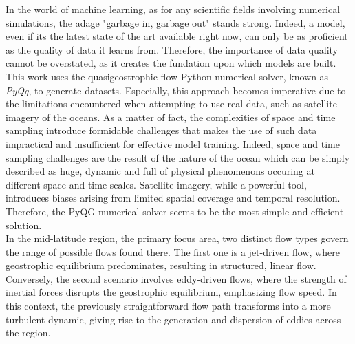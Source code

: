 %
\newpage




\setlength{\parindent}{0pt}

In the world of machine learning, as for any scientific fields involving numerical simulations, the adage "garbage in, garbage out" stands strong. Indeed, a model, even if its the latest state of the art available right now, can only be as proficient as the quality of data it learns from. Therefore, the importance of data quality cannot be overstated, as it creates the fundation upon which models are built.\\

This work uses the quasigeostrophic flow Python numerical solver, known as \textit{PyQg}, to generate datasets.  Especially, this approach becomes imperative due to the limitations encountered when attempting to use real data, such as satellite imagery of the oceans. As a matter of fact, the complexities of space and time sampling introduce formidable challenges that makes the use of such data impractical and insufficient for effective model training. Indeed, space and time sampling challenges are the result of the nature of the ocean which can be simply described as huge, dynamic and full of physical phenomenons occuring at different space and time scales. Satellite imagery, while a powerful tool, introduces biases arising from limited spatial coverage and temporal resolution. Therefore, the PyQG numerical solver seems to be the most simple and efficient solution.\\

In the mid-latitude region, the primary focus area, two distinct flow types govern the range of possible flows found there. The first one is a jet-driven flow, where geostrophic equilibrium predominates, resulting in structured, linear flow. Conversely, the second scenario involves eddy-driven flows, where the strength of inertial forces disrupts the geostrophic equilibrium, emphasizing flow speed. In this context, the previously straightforward flow path transforms into a more turbulent dynamic, giving rise to the generation and dispersion of eddies across the region.\\


